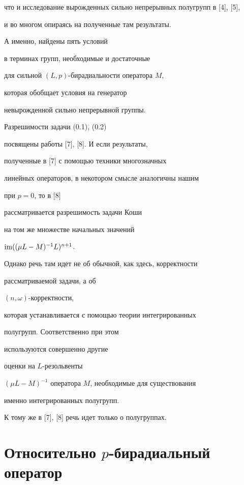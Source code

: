 что и исследование вырожденных сильно непрерывных полугрупп в [4], [5],


и во многом опираясь на полученные там результаты.


А именно, найдены пять условий


в терминах групп, необходимые и достаточные


для сильной $(L,p)$-бирадиальности оператора $M$,


которая обобщает условия на генератор


невырожденной сильно непрерывной группы.








Разрешимости задачи (0.1), (0.2)


посвящены работы [7], [8]. И если результаты,


полученные в [7] с помощью техники многозначных


линейных операторов, в некотором смысле аналогичны нашим


при $p=0$, то в [8]


рассматривается разрешимость задачи Коши


на том же множестве начальных значений


$\operatorname{im} ((\mu L-M)^{-1}L)^{n+1}$.


Однако речь там идет не об обычной, как здесь, корректности


рассматриваемой задачи, а об


$(n,\omega)$-корректности,


которая устанавливается с помощью теории интегрированных


полугрупп. Соответственно при этом


используются совершенно другие


оценки на $L$-резольвенты


$(\mu L-M)^{-1}$ оператора $M$, необходимые для существования


именно интегрированных полугрупп.


К тому же в [7], [8] речь идет только о полугруппах.





\section{Относительно $p$-бирадиальный оператор}






